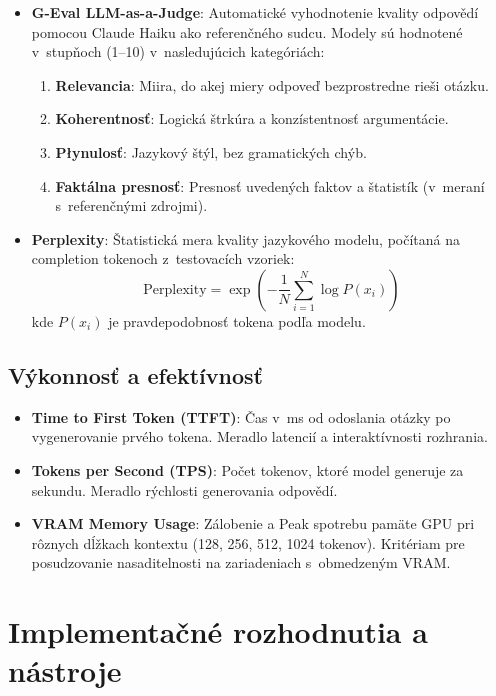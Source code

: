 \begin{itemize}
    \item \textbf{G-Eval LLM-as-a-Judge}: Automatické vyhodnotenie kvality odpovědí pomocou Claude Haiku ako referenčného sudcu. Modely sú hodnotené v~stupňoch (1--10) v~nasledujúcich kategóriách:
    \begin{enumerate}
        \item \textbf{Relevancia}: Miira, do akej miery odpoveď bezprostredne rieši otázku.
        \item \textbf{Koherentnosť}: Logická štrkúra a konzístentnosť argumentácie.
        \item \textbf{Płynulosť}: Jazykový štýl, bez gramatických chýb.
        \item \textbf{Faktálna presnosť}: Presnosť uvedených faktov a štatistík (v~meraní s~referenčnými zdrojmi).
    \end{enumerate}

    \item \textbf{Perplexity}: Štatistická mera kvality jazykového modelu, počítaná na completion tokenoch z~testovacích vzoriek:
    \[
        \text{Perplexity} = \exp\left( -\frac{1}{N} \sum_{i=1}^{N} \log P(x_i) \right)
    \]
    kde $P(x_i)$ je pravdepodobnosť tokena podľa modelu.
\end{itemize}

\subsection{Výkonnosť a efektívnosť}

\begin{itemize}
    \item \textbf{Time to First Token (TTFT)}: Čas v~ms od odoslania otázky po vygenerovanie prvého tokena. Meradlo latencií a interaktívnosti rozhrania.

    \item \textbf{Tokens per Second (TPS)}: Počet tokenov, ktoré model generuje za sekundu. Meradlo rýchlosti generovania odpovědí.

    \item \textbf{VRAM Memory Usage}: Zálobenie a Peak spotrebu pamäte GPU pri rôznych dĺžkach kontextu (128, 256, 512, 1024 tokenov). Kritériam pre posudzovanie nasaditelnosti na zariadeniach s~obmedzeným VRAM.
\end{itemize}


\section{Implementačné rozhodnutia a nástroje}

